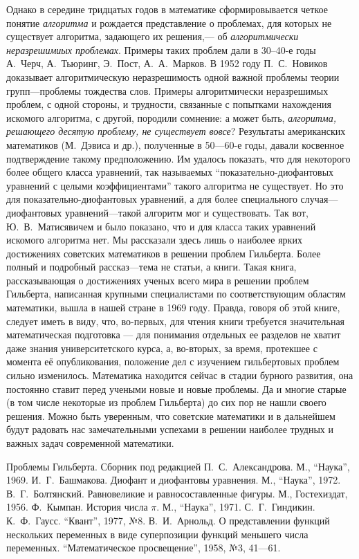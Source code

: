 \documentclass[twocolumn,10pt]{article}
\begin{document}
Однако в середине тридцатых годов в математике сформировывается четкое понятие \emph{алгоритма} и рождается представление о проблемах, для которых не существует алгоритма, задающего их решения,--- об \emph{алгоритмически неразрешимиых проблемах}. Примеры таких проблем дали в 30--40-е годы А.~Черч, А.~Тьюринг, Э.~Пост, А.~А.~Марков. В 1952 году П.~С.~Новиков доказывает алгоритмическую неразрешимость одной важной проблемы теории групп---проблемы тождества слов. Примеры алгоритмически неразрешимых проблем, с одной стороны, и трудности, связанные с попытками нахождения искомого алгоритма, с другой, породили сомнение: а может быть, \emph{алгоритма, решающего десятую проблему, не существует вовсе}? Результаты американских математиков (М.~Дэвиса и др.), полученные в 50---60-е годы, давали косвенное подтверждение такому предположению. Им удалось показать, что для некоторого более общего класса уравнений, так называемых ``показательно-диофантовых уравнений с целыми коэффициентами'' такого алгоритма не существует. Но это для показательно-диофантовых уравнений, а для более специального случая---диофантовых уравнений---такой алгоритм мог и существовать. Так вот, Ю.~В.~Матисявичем и было показано, что и для класса таких уравнений искомого алгоритма нет.
\stars
Мы рассказали здесь лишь о наиболее ярких достижениях советских математиков в решении проблем Гильберта. Более полный и подробный рассказ---тема не статьи, а книги. Такая книга, рассказывающая о достижениях ученых всего мира в решении проблем Гильберта, написанная крупными специалистами по соответствующим областям математики, вышла в нашей стране в 1969 году. Правда, говоря об этой книге, следует иметь в виду, что, во-первых, для чтения книги требуется значительная математическая подготовка --- для понимания отдельных ее разделов не хватит даже знания университетского курса, а, во-вторых, за время, протекшее с момента её опубликования, положение дел с изучением гильбертовых проблем сильно изменилось. Математика находится сейчас в стадии бурного развития, она постоянно ставит перед учеными новые и новые проблемы. Да и многие старые (в том числе некоторые из проблем Гильберта) до сих пор не нашли своего решения. Можно быть уверенным, что советские математики и в дальнейшем будут радовать нас замечательными успехами в решении наиболее трудных и важных задач современной математики.

\begin{thebibliography}{99}
 Проблемы Гильберта. Сборник под редакцией П.~С.~Александрова. М., ``Наука'', 1969.
 И.~Г.~Башмакова. Диофант и диофантовы уравнения. М., ``Наука'', 1972.
 В.~Г.~Болтянский. Равновеликие и равносоставленные фигуры. М., Гостехиздат, 1956.
 Ф.~Кымпан. История числа $\pi$. М., ``Наука'', 1971.
 С.~Г.~Гиндикин. К.~Ф.~Гаусс. ``Квант'', 1977, №8.
 В.~И.~Арнольд. О представлении функций нескольких переменных в виде суперпозиции функций меньшего числа переменных. ``Математическое просвещение'', 1958, №3, 41---61.
\end{thebibliography}
\end{document}
